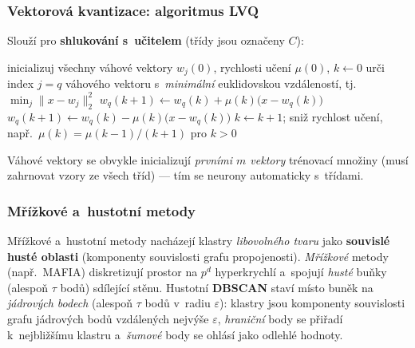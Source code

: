 \documentclass[11pt,a4paper]{article}
\theoremstyle{definition}
\begin{document}
\subsubsection{Vektorová kvantizace: algoritmus LVQ}

\begin{defbox}
Slouží pro \textbf{shlukování s~učitelem} (třídy jsou označeny $C$):
\begin{algorithmic}[1]
\State inicializuj všechny váhové vektory $w_j(0)$, rychlosti učení $\mu(0)$, $k\gets 0$
     \State urči index $j=q$ váhového vektoru s~\emph{minimální} euklidovskou vzdáleností,
            tj.\ $\min_j\|x-w_j\|_2^2$
        \State $w_q(k+1)\gets w_q(k)+\mu(k)\big(x-w_q(k)\big)$ 
     \Else
        \State $w_q(k+1)\gets w_q(k)-\mu(k)\big(x-w_q(k)\big)$ 
     \EndIf
  \EndFor
  \State $k\gets k+1$; sniž rychlost učení, např.\ $\mu(k)=\mu(k-1)/(k+1)$ pro $k>0$
\EndWhile
\end{algorithmic}
Váhové vektory se obvykle inicializují \emph{prvními $m$ vektory} trénovací množiny (musí
zahrnovat vzory ze všech tříd) --- tím se neurony automaticky  s~třídami.
\end{defbox}

\subsubsection{Mřížkové a~hustotní metody}

Mřížkové a~hustotní metody nacházejí klastry \emph{libovolného tvaru} jako \textbf{souvislé
husté oblasti} (komponenty souvislosti grafu propojenosti). \emph{Mřížkové} metody (např.\
MAFIA) diskretizují prostor na $p^d$ hyperkrychlí a~spojují \emph{husté} buňky (alespoň
$\tau$ bodů) sdílející stěnu. Hustotní \textbf{DBSCAN} staví místo buněk na \emph{jádrových
bodech} (alespoň $\tau$ bodů v~radiu $\varepsilon$): klastry jsou komponenty souvislosti
grafu jádrových bodů vzdálených nejvýše $\varepsilon$, \emph{hraniční} body se přiřadí
k~nejbližšímu klastru a~\emph{šumové} body se ohlásí jako odlehlé hodnoty.
\end{document}
